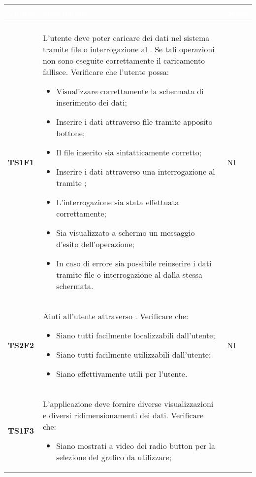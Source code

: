 \begin{longtable}{C{2cm} C{12cm} C{1.5cm}} 
		\textcolor{white}{\textbf{Codice}} & 
		\textcolor{white}{\textbf{Descrizione}} & 
		\textcolor{white}{\textbf{Stato}} \\
		\endfirsthead
		\\
	    \endfoot
	    \endlastfoot
		\hline
\textbf{TS1F1} & L'utente deve poter caricare dei dati nel sistema tramite file  o interrogazione al . Se tali operazioni non sono eseguite correttamente il caricamento fallisce. Verificare che l'utente possa: 
					\begin{itemize}
						\item Visualizzare correttamente la schermata di inserimento dei dati;
						\item Inserire i dati attraverso file  tramite apposito bottone;
						\item Il file  inserito sia sintatticamente corretto; 
						\item Inserire i dati attraverso una interrogazione al  tramite ;
						\item L'interrogazione sia stata effettuata correttamente;
						\item Sia visualizzato a schermo un messaggio d'esito dell'operazione;
						\item In caso di errore sia possibile reinserire i dati tramite file  o interrogazione al  dalla stessa schermata.
					\end{itemize}					 			    
			  & NI\\
\textbf{TS2F2} &  Aiuti all'utente attraverso . Verificare che:
					\begin{itemize}
						\item Siano tutti facilmente localizzabili dall'utente;
						\item Siano tutti facilmente utilizzabili dall'utente;
						\item Siano effettivamente utili per l'utente.
					\end{itemize}	
 			   & NI \\ 
\textbf{TS1F3} &  L'applicazione deve fornire diverse visualizzazioni e diversi ridimensionamenti dei dati. Verificare che: 
					\begin{itemize}
						\item Siano mostrati a video dei radio button per la selezione del grafico da utilizzare;

\end{itemize}
\end{longtable}
